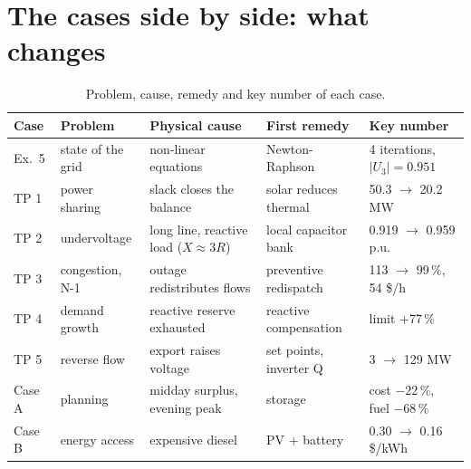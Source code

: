 \documentclass[11pt,a4paper]{article}
\begin{document}
\section{The cases side by side: what changes}
\begin{table}[h]\centering\small
\caption{Problem, cause, remedy and key number of each case.}
\begin{tabularx}{\textwidth}{@{}l>{\raggedright}p{2.6cm}>{\raggedright}p{3.6cm}>{\raggedright}p{3.3cm}X@{}}
\toprule
Case & Problem & Physical cause & First remedy & Key number \\
\midrule
Ex.\ 5 & state of the grid & non-linear equations & Newton-Raphson & 4 iterations, $|U_3| = 0.951$ \\
TP 1 & power sharing & slack closes the balance & solar reduces thermal & 50.3 $\to$ 20.2 MW \\
TP 2 & undervoltage & long line, reactive load ($X \approx 3R$) & local capacitor bank & 0.919 $\to$ 0.959 p.u. \\
TP 3 & congestion, N-1 & outage redistributes flows & preventive redispatch & 113 $\to$ 99\,\%, 54 \$/h \\
TP 4 & demand growth & reactive reserve exhausted & reactive compensation & limit +77\,\% \\
TP 5 & reverse flow & export raises voltage & set points, inverter Q & 3 $\to$ 129 MW \\
Case A & planning & midday surplus, evening peak & storage & cost $-22\,\%$, fuel $-68\,\%$ \\
Case B & energy access & expensive diesel & PV + battery & 0.30 $\to$ 0.16 \$/kWh \\
\bottomrule
\end{tabularx}
\end{table}
\end{document}
